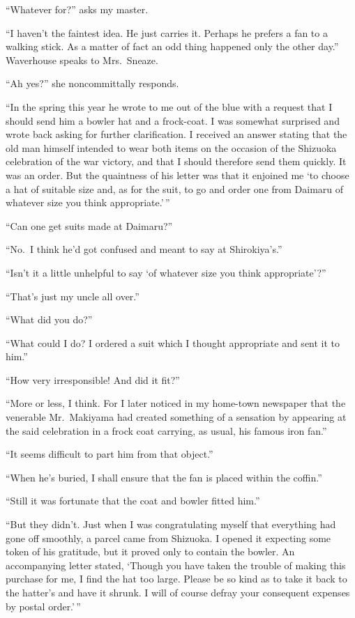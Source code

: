 \documentclass{book}
\begin{document}
``Whatever for?'' asks my master.

``I haven't the faintest idea. He just carries it. Perhaps he prefers a
fan to a walking stick. As a matter of fact an odd thing happened only
the other day.'' Waverhouse speaks to Mrs.~Sneaze.

``Ah yes?'' she noncommittally responds.

``In the spring this year he wrote to me out of the blue with a request
that I should send him a bowler hat and a frock-coat. I was somewhat
surprised and wrote back asking for further clarification. I received an
answer stating that the old man himself intended to wear both items on
the occasion of the Shizuoka celebration of the war victory, and that I
should therefore send them quickly. It was an order. But the quaintness
of his letter was that it enjoined me `to choose a hat of suitable size
and, as for the suit, to go and order one from Daimaru of whatever size
you think appropriate.'\,''

``Can one get suits made at Daimaru?''

``No.~I think he'd got confused and meant to say at Shirokiya's.''

``Isn't it a little unhelpful to say `of whatever size you think
appropriate'?''

``That's just my uncle all over.''

``What did you do?''

``What could I do? I ordered a suit which I thought appropriate and sent
it to him.''

``How very irresponsible! And did it fit?''

``More or less, I think. For I later noticed in my home-town newspaper
that the venerable Mr.~Makiyama had created something of a sensation by
appearing at the said celebration in a frock coat carrying, as usual,
his famous iron fan.''

``It seems difficult to part him from that object.''

``When he's buried, I shall ensure that the fan is placed within the
coffin.''

``Still it was fortunate that the coat and bowler fitted him.''

``But they didn't. Just when I was congratulating myself that everything
had gone off smoothly, a parcel came from Shizuoka. I opened it
expecting some token of his gratitude, but it proved only to contain the
bowler. An accompanying letter stated, `Though you have taken the
trouble of making this purchase for me, I find the hat too large. Please
be so kind as to take it back to the hatter's and have it shrunk. I will
of course defray your consequent expenses by postal order.'\,''
\end{document}
